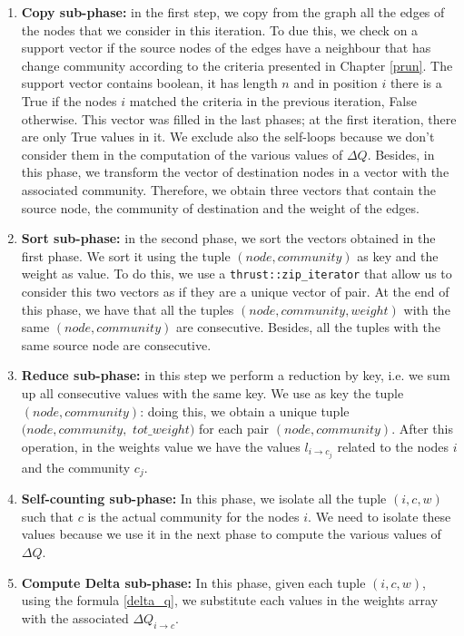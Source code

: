 \begin{enumerate}
	\item \textbf{Copy sub-phase:} in the first step, we copy from the graph all the edges of the nodes that we consider in this iteration. To due this, we check on a support vector if the source nodes of the edges have a neighbour that has change community according to the criteria presented in Chapter \ref{prun}. The support vector contains boolean, it has length $n$ and in position $i$ there is a True if the nodes $i$ matched the criteria in the previous iteration, False otherwise. This vector was filled in the last phases; at the first iteration, there are only True values in it. We exclude also the self-loops because we don't consider them in the computation of the various values of $\Delta Q$. Besides, in this phase, we transform the vector of destination nodes in a vector with the associated community. Therefore, we obtain three vectors that contain the source node, the community of destination and the weight of the edges.  
	\item \textbf{Sort sub-phase:} in the second phase, we sort the vectors obtained in the first phase. We sort it using the tuple $(node, community)$ as key and the weight as value.
	To do this, we use a  \verb|thrust::zip_iterator| that allow us to consider this two vectors as if they are a unique vector of pair.  At the end of this phase, we have that all the tuples $(node, community, weight)$ with the same $(node, community)$ are consecutive. Besides, all the tuples with the same source node are consecutive.
	\item \textbf{Reduce sub-phase:} in this step we perform a reduction by key, i.e. we sum up all consecutive values with the same key. We use as key the tuple $(node, community)$: doing this, we obtain a unique tuple $(node, community,$  $tot\_weight)$ for each pair $(node, community)$. After this operation, in the weights value we have the values $l_{i\rightarrow c_j}$ related to the nodes $i$ and the community $c_j$.
	\item \textbf{Self-counting sub-phase:} In this phase, we isolate all the tuple  $(i, c, w)$ such that 
	$c$ is the actual community for the nodes $i$. We need to isolate these values because we use it in the next phase to compute the various values of $\Delta Q$.
	\item \textbf{Compute Delta sub-phase:} In this phase, given each tuple $(i, c, w)$, using the formula \ref{delta_q}, we substitute each values in the weights array with the associated $\Delta Q_{i\rightarrow c}$.

\end{enumerate}
